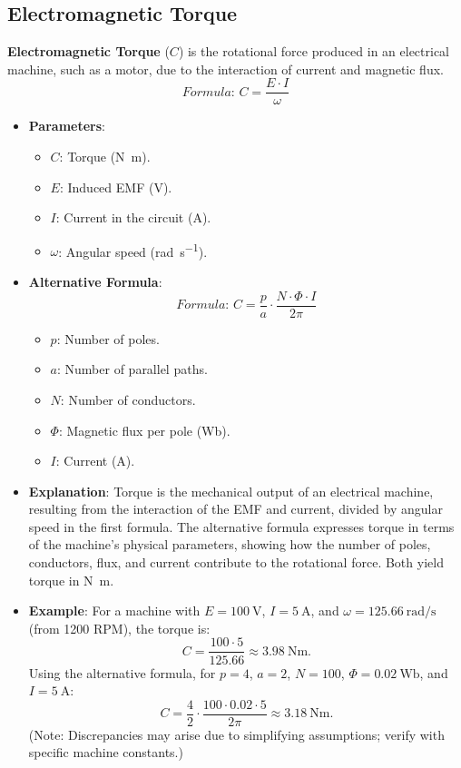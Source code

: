 \documentclass[12pt]{article}
\newcommand{\concept}[1]{\textbf{#1}}
\newcommand{\formula}[1]{\textit{Formula: }#1}
\begin{document}
\subsection{Electromagnetic Torque}
\concept{Electromagnetic Torque} (\(C\)) is the rotational force produced in an electrical machine, such as a motor, due to the interaction of current and magnetic flux.
\[
\formula{C = \frac{E \cdot I}{\omega}}
\]
\begin{itemize}
    \item \textbf{Parameters}:
        \begin{itemize}
            \item \(C\): Torque (\si{\newton\metre}).
            \item \(E\): Induced EMF (\si{\volt}).
            \item \(I\): Current in the circuit (\si{\ampere}).
            \item \(\omega\): Angular speed (\si{\radian\per\second}).
        \end{itemize}
    \item \textbf{Alternative Formula}:
        \[
        \formula{C = \frac{p}{a} \cdot \frac{N \cdot \Phi \cdot I}{2 \pi}}
        \]
        \begin{itemize}
            \item \(p\): Number of poles.
            \item \(a\): Number of parallel paths.
            \item \(N\): Number of conductors.
            \item \(\Phi\): Magnetic flux per pole (\si{\weber}).
            \item \(I\): Current (\si{\ampere}).
        \end{itemize}
    \item \textbf{Explanation}: Torque is the mechanical output of an electrical machine, resulting from the interaction of the EMF and current, divided by angular speed in the first formula. The alternative formula expresses torque in terms of the machine’s physical parameters, showing how the number of poles, conductors, flux, and current contribute to the rotational force. Both yield torque in \si{\newton\metre}.
    \item \textbf{Example}: For a machine with \(E = \SI{100}{\volt}\), \(I = \SI{5}{\ampere}\), and \(\omega = \SI{125.66}{\radian\per\second}\) (from 1200 RPM), the torque is:
        \[
        C = \frac{100 \cdot 5}{125.66} \approx \SI{3.98}{\newton\metre}.
        \]
        Using the alternative formula, for \(p = 4\), \(a = 2\), \(N = 100\), \(\Phi = \SI{0.02}{\weber}\), and \(I = \SI{5}{\ampere}\):
        \[
        C = \frac{4}{2} \cdot \frac{100 \cdot 0.02 \cdot 5}{2 \pi} \approx \SI{3.18}{\newton\metre}.
        \]
        (Note: Discrepancies may arise due to simplifying assumptions; verify with specific machine constants.)
\end{itemize}
\end{document}
